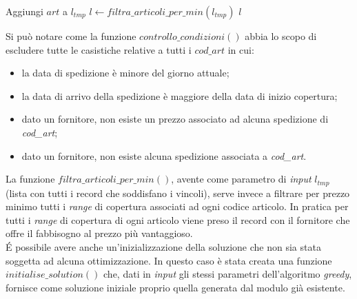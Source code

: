 \begin{algorithm}
    \begin{algorithmic}
                    \State Aggiungi $art$ a $l_{tmp}$
                \EndIf
            \EndFor
        \EndWhile
        \State $l \gets filtra\_articoli\_per\_min(l_{tmp})$
        \State \Return $l$
        \EndProcedure
    \end{algorithmic}
\end{algorithm}
\vspace*{\fill}
\newpage
\noindent Si può notare come la funzione $controllo\_condizioni()$ abbia lo scopo di escludere tutte le casistiche relative a tutti i $cod\_art$ in cui:
\begin{itemize}
    \item la data di spedizione è minore del giorno attuale;
    \item la data di arrivo della spedizione è maggiore della data di inizio copertura;
    \item dato un fornitore, non esiste un prezzo associato ad alcuna spedizione di \textit{cod\_art};
    \item dato un fornitore, non esiste alcuna spedizione associata a \textit{cod\_art}.
\end{itemize}

\noindent La funzione $filtra\_articoli\_per\_min()$, avente come parametro di \textit{input} $l_{tmp}$ (lista con tutti i record che soddisfano i vincoli),
serve invece a filtrare per prezzo minimo tutti i \textit{range} di copertura associati ad ogni codice articolo.
In pratica per tutti i \textit{range} di copertura di ogni articolo viene preso il record con il fornitore che offre il fabbisogno al prezzo più vantaggioso.\\

\noindent É possibile avere anche un'inizializzazione della soluzione che non sia stata soggetta ad alcuna ottimizzazione.
In questo caso è stata creata una funzione $initialise\_solution()$ che, dati in \textit{input} gli stessi parametri dell'algoritmo \textit{greedy}, fornisce
come soluzione iniziale proprio quella generata dal modulo già esistente. 

